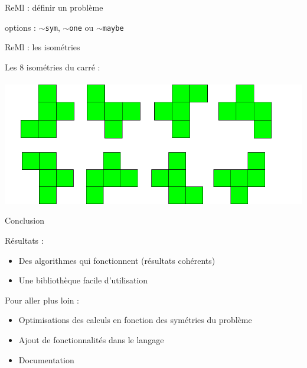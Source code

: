 \documentclass{beamer}
\begin{document}
\begin{frame}{ReMl : définir un problème}



options :  
\texttt{$\sim$sym}, \texttt{$\sim$one} ou \texttt{$\sim$maybe}
 
 \end{frame}


\begin{frame}{ReMl : les isométries}

Les 8 isométries du carré : \\
~\\

\includegraphics[scale=0.5]{../imports/transformations.pdf}
\end{frame}




\begin{frame}{Conclusion}

Résultats :  
\begin{itemize}
\item Des algorithmes qui fonctionnent (résultats cohérents)
\item Une bibliothèque facile d'utilisation
\end{itemize}

\medskip
Pour aller plus loin : 
\begin{itemize}
\item Optimisations des calculs en fonction des symétries du problème
\item Ajout de fonctionnalités dans le langage
\item Documentation
\end{itemize}



\end{frame}
\end{document}
